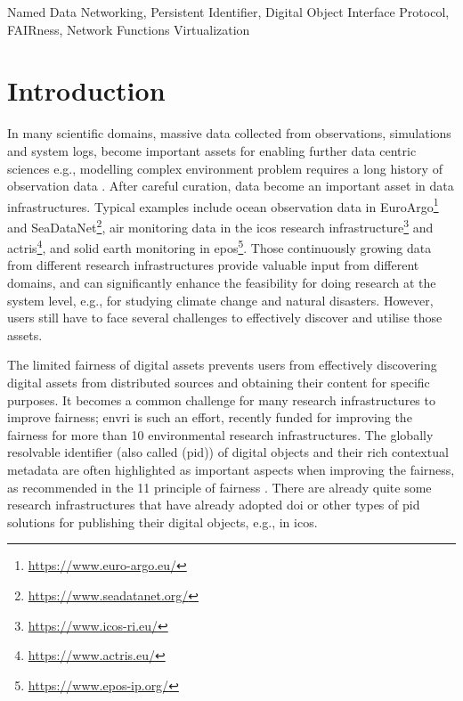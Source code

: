 \documentclass[conference]{IEEEtran}
\begin{document}
\begin{abstract}



\end{abstract}

\begin{IEEEkeywords}
Named Data Networking, Persistent Identifier, Digital Object Interface Protocol, FAIRness, Network Functions Virtualization
\end{IEEEkeywords}

\section{Introduction}
In many scientific domains, massive data collected from observations, simulations and system logs, become important assets for enabling further data centric sciences e.g., modelling complex environment problem requires a long history of observation data \cite{}. After careful curation, data become an important asset in data infrastructures. Typical examples include ocean observation data in EuroArgo\footnote{\url{https://www.euro-argo.eu/}} and SeaDataNet\footnote{\url{https://www.seadatanet.org/}}, air monitoring data in the \gls{icos} research infrastructure\footnote{\url{https://www.icos-ri.eu/}} and \gls{actris}\footnote{\url{https://www.actris.eu/}}, and solid earth monitoring in \gls{epos}\footnote{\url{https://www.epos-ip.org/}}. Those continuously growing data from different research infrastructures provide valuable input from different domains, and can significantly enhance the feasibility for doing research at the system level, e.g., for studying climate change and natural disasters. However, users still have to face several challenges to effectively discover and utilise those assets.

The limited \gls{fairness} of digital assets prevents users from effectively discovering digital assets from distributed sources and obtaining their content for specific purposes. It becomes a common challenge for many research infrastructures to improve \gls{fairness}; \gls{envri} is such an effort, recently funded for improving the \gls{fairness} for more than 10 environmental research infrastructures. The globally resolvable identifier (also called (\gls{pid})) of digital objects and their rich contextual metadata are often highlighted as important aspects when improving the \gls{fairness}, as recommended in the 11 principle of \gls{fairness} \cite{}. There are already quite some research infrastructures that have already adopted \gls{doi} or other types of \gls{pid} solutions for publishing their digital objects, e.g., in \gls{icos}.
\end{document}
